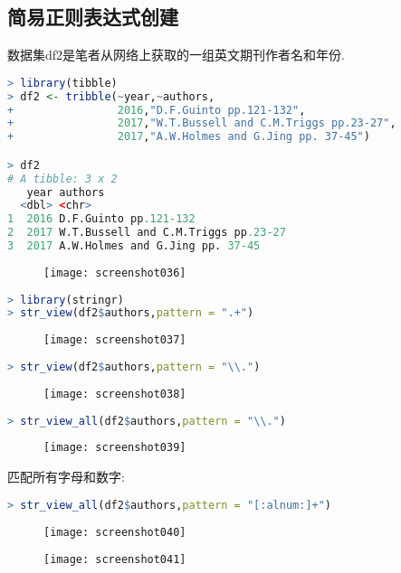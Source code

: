 \documentclass[11pt,a4paper,oneside]{book}
\begin{document}
\subsection{简易正则表达式创建}
数据集df2是笔者从网络上获取的一组英文期刊作者名和年份.

\begin{lstlisting}[language=r]
> library(tibble)
> df2 <- tribble(~year,~authors,
+                2016,"D.F.Guinto pp.121-132",
+                2017,"W.T.Bussell and C.M.Triggs pp.23-27",
+                2017,"A.W.Holmes and G.Jing pp. 37-45")

> df2
# A tibble: 3 x 2
   year authors                            
  <dbl> <chr>                              
1  2016 D.F.Guinto pp.121-132              
2  2017 W.T.Bussell and C.M.Triggs pp.23-27
3  2017 A.W.Holmes and G.Jing pp. 37-45    
\end{lstlisting}
\begin{figure}[H]
	\centering
	\texttt{[image: screenshot036]}
\end{figure}

\begin{lstlisting}[language=r]
> library(stringr)
> str_view(df2$authors,pattern = ".+")
\end{lstlisting}
\begin{figure}[H]
	\centering
	\texttt{[image: screenshot037]}
\end{figure}

\begin{lstlisting}[language=r]
> str_view(df2$authors,pattern = "\\.")
\end{lstlisting}
\begin{figure}[H]
	\centering
	\texttt{[image: screenshot038]}
\end{figure}

\begin{lstlisting}[language=r]
> str_view_all(df2$authors,pattern = "\\.")
\end{lstlisting}
\begin{figure}[H]
	\centering
	\texttt{[image: screenshot039]}
\end{figure}

匹配所有字母和数字:
\begin{lstlisting}[language=r]
> str_view_all(df2$authors,pattern = "[:alnum:]+")
\end{lstlisting}
\begin{figure}[H]
	\centering
	\texttt{[image: screenshot040]}
\end{figure}
\begin{figure}[H]
	\centering
	\texttt{[image: screenshot041]}
\end{figure}
\end{document}
